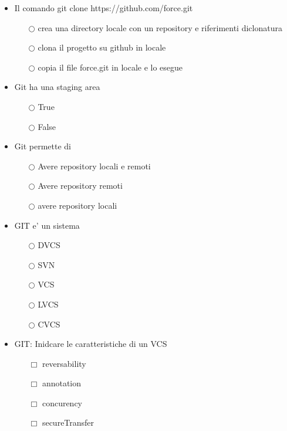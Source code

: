 \documentclass[10pt,twocolumn]{article}
\begin{document}
\begin{itemize}
    \item Il comando git clone https://github.com/force.git
          \begin{itemize}
              \item[$\bigcirc$] crea una directory locale con un repository e riferimenti diclonatura
              \item[$\bigcirc$] clona il progetto su github in locale
              \item[$\bigcirc$] copia il file force.git in locale e lo esegue
          \end{itemize}
\end{itemize}
\begin{itemize}
    \item Git ha una staging area
          \begin{itemize}
              \item[$\bigcirc$] True
              \item[$\bigcirc$] False
          \end{itemize}
\end{itemize}
\begin{itemize}
    \item Git permette di
          \begin{itemize}
              \item[$\bigcirc$] Avere repository locali e remoti
              \item[$\bigcirc$] Avere repository remoti
              \item[$\bigcirc$] avere repository locali
          \end{itemize}
\end{itemize}
\begin{itemize}
    \item GIT e' un sistema
          \begin{itemize}
              \item[$\bigcirc$] DVCS
              \item[$\bigcirc$] SVN
              \item[$\bigcirc$] VCS
              \item[$\bigcirc$] LVCS
              \item[$\bigcirc$] CVCS
          \end{itemize}
\end{itemize}
\begin{itemize}
    \item GIT: Inidcare le caratteristiche di un VCS
          \begin{itemize}
              \item[$\Box$] reversability
              \item[$\Box$] annotation
              \item[$\Box$] concurency
              \item[$\Box$] secureTransfer
          \end{itemize}
\end{itemize}
\end{document}

